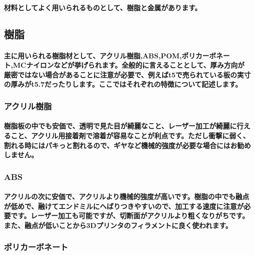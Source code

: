 \documentclass[b5paper, 9pt, twocolumn, titlepage,openany]{jsbook}%
\begin{document}
\paragraph{材料としてよく用いられるものとして、樹脂と金属があります。}

\subsection{樹脂}

\paragraph{主に用いられる樹脂材として、アクリル樹脂,ABS,POM,ポリカーボネート,MCナイロンなどが挙げられます。全般的に言えることとして、厚み方向が厳密ではない場合があることに注意が必要で、例えばt5で売られている板の実寸の厚みがt5.7だったりします。ここではそれぞれの特徴について記述します。}

\subsubsection{アクリル樹脂}

\paragraph{樹脂板の中でも安価で、透明で見た目が綺麗なこと、レーザー加工が綺麗に行えること、アクリル用接着剤で溶着が容易なことが利点です。ただし衝撃に弱く、割れる時にはパキっと割れるので、ギヤなど機械的強度が必要な場合にはお勧めしません。}

\subsubsection{ABS}

\paragraph{アクリルの次に安価で、アクリルより機械的強度が高いです。樹脂の中でも融点が低めで、融けてエンドミルにへばりつきやすいので、加工する速度に注意が必要です。レーザー加工も可能ですが、切断面がアクリルより粗くなりがちです。また、融点が低いことから3Dプリンタのフィラメントに良く使われます。}

\subsubsection{ポリカーボネート}
\end{document}
